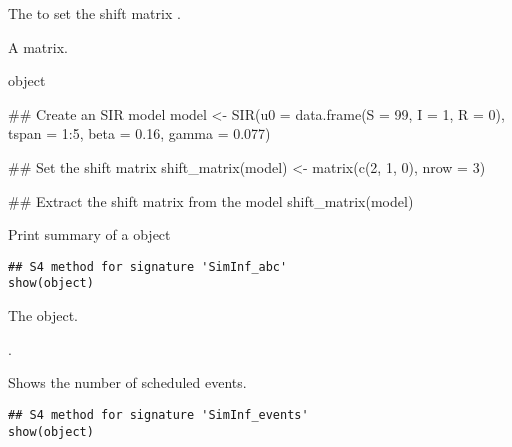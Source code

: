 \documentclass[letterpaper]{book}
\begin{document}
%
\begin{Arguments}
\begin{ldescription}
\item[\code{model}] The  to set the shift matrix
.

\item[\code{value}] A matrix.
\end{ldescription}
\end{Arguments}
%
\begin{Value}
 object
\end{Value}
%
\begin{Examples}
\begin{ExampleCode}
## Create an SIR model
model <- SIR(u0 = data.frame(S = 99, I = 1, R = 0),
             tspan = 1:5, beta = 0.16, gamma = 0.077)

## Set the shift matrix
shift_matrix(model) <- matrix(c(2, 1, 0), nrow = 3)

## Extract the shift matrix from the model
shift_matrix(model)
\end{ExampleCode}
\end{Examples}
%
\begin{Description}
Print summary of a  object
\end{Description}
%
\begin{Usage}
\begin{verbatim}
## S4 method for signature 'SimInf_abc'
show(object)
\end{verbatim}
\end{Usage}
%
\begin{Arguments}
\begin{ldescription}
\item[\code{object}] The  object.
\end{ldescription}
\end{Arguments}
%
\begin{Value}
.
\end{Value}
%
\begin{Description}
Shows the number of scheduled events.
\end{Description}
%
\begin{Usage}
\begin{verbatim}
## S4 method for signature 'SimInf_events'
show(object)
\end{verbatim}
\end{Usage}
\end{document}
